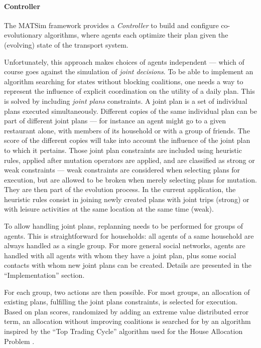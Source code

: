 {\paragraph{Controller}

The MATSim framework provides a \emph{Controller} to build and configure
co-evolutionary algorithms, where agents each optimize their plan given
the (evolving) state of the transport system.

Unfortunately, this approach makes choices of agents independent ---
which of course goes against the simulation of \emph{joint decisions}.
To be able to implement an algorithm searching for states without
blocking coalitions, one needs a way to represent the influence of
explicit coordination on the utility of a daily plan. This is solved by
including \emph{joint plans} constraints. A joint plan is a set of
individual plans executed simultaneously. Different copies of the same
individual plan can be part of different joint plans --- for instance an
agent might go to a given restaurant alone, with members of its
household or with a group of friends. The score of the different copies
will take into account the influence of the joint plan to which it
pertains. Those joint plan constraints are included using heuristic
rules, applied after mutation operators are applied, and are classified
as strong or weak constraints --- weak constraints are considered when
selecting plans for execution, but are allowed to be broken when merely
selecting plans for mutation. They are then part of the evolution
process. In the current application, the heuristic rules consist in
joining newly created plans with joint trips (strong) or with leisure
activities at the same location at the same time (weak).

To allow handling joint plans, replanning needs to be performed for
groups of agents. This is straightforward for households: all agents of
a same household are always handled as a single group. For more general
social networks, agents are handled with all agents with whom they have
a joint plan, plus some social contacts with whom new joint plans can be
created. Details are presented in the ``Implementation'' section.

For each group, two actions are then possible. For most groups, an
allocation of existing plans, fulfilling the joint plans constraints, is
selected for execution. Based on plan scores, randomized by adding an
extreme value distributed error term, an allocation without improving
coalitions is searched for by an algorithm inspired by the ``Top Trading
Cycle'' algorithm used for the House Allocation Problem
\cite{SchummerVohra_NisanEtAl_2007}.

}
